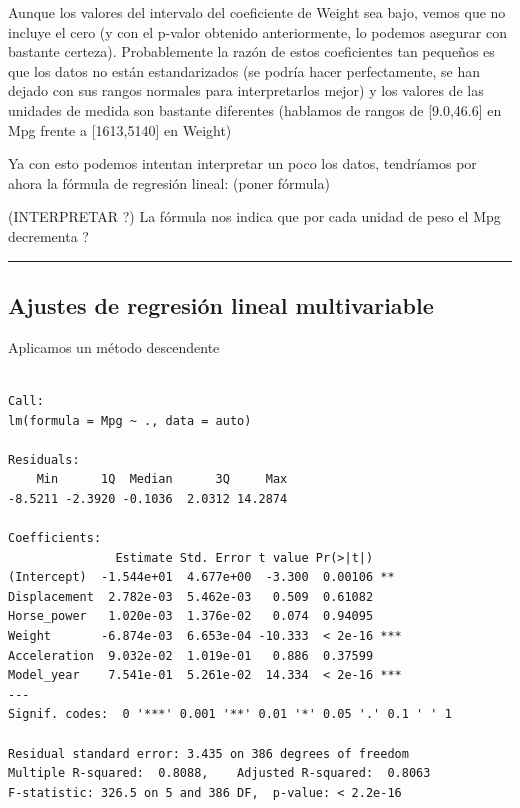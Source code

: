 \documentclass[
]{article}
\newenvironment{Shaded}{\begin{snugshade}}{\end{snugshade}}
\newcommand{\DataTypeTok}[1]{\textcolor[rgb]{0.13,0.29,0.53}{#1}}
\newcommand{\KeywordTok}[1]{\textcolor[rgb]{0.13,0.29,0.53}{\textbf{#1}}}
\newcommand{\NormalTok}[1]{#1}
\newcommand{\OperatorTok}[1]{\textcolor[rgb]{0.81,0.36,0.00}{\textbf{#1}}}
\newcommand{\StringTok}[1]{\textcolor[rgb]{0.31,0.60,0.02}{#1}}
\begin{document}
Aunque los valores del intervalo del coeficiente de Weight sea bajo,
vemos que no incluye el cero (y con el p-valor obtenido anteriormente,
lo podemos asegurar con bastante certeza). Probablemente la razón de
estos coeficientes tan pequeños es que los datos no están estandarizados
(se podría hacer perfectamente, se han dejado con sus rangos normales
para interpretarlos mejor) y los valores de las unidades de medida son
bastante diferentes (hablamos de rangos de {[}9.0,46.6{]} en Mpg frente
a {[}1613,5140{]} en Weight)

Ya con esto podemos intentan interpretar un poco los datos, tendríamos
por ahora la fórmula de regresión lineal: (poner fórmula)

(INTERPRETAR ?) La fórmula nos indica que por cada unidad de peso el Mpg
decrementa ?

\begin{center}\rule{0.5\linewidth}{0.5pt}\end{center}

\hypertarget{ajustes-de-regresiuxf3n-lineal-multivariable}{%
\subsection{Ajustes de regresión lineal
multivariable}\label{ajustes-de-regresiuxf3n-lineal-multivariable}}

Aplicamos un método descendente

\begin{Shaded}
\end{Shaded}

\begin{verbatim}

Call:
lm(formula = Mpg ~ ., data = auto)

Residuals:
    Min      1Q  Median      3Q     Max 
-8.5211 -2.3920 -0.1036  2.0312 14.2874 

Coefficients:
               Estimate Std. Error t value Pr(>|t|)    
(Intercept)  -1.544e+01  4.677e+00  -3.300  0.00106 ** 
Displacement  2.782e-03  5.462e-03   0.509  0.61082    
Horse_power   1.020e-03  1.376e-02   0.074  0.94095    
Weight       -6.874e-03  6.653e-04 -10.333  < 2e-16 ***
Acceleration  9.032e-02  1.019e-01   0.886  0.37599    
Model_year    7.541e-01  5.261e-02  14.334  < 2e-16 ***
---
Signif. codes:  0 '***' 0.001 '**' 0.01 '*' 0.05 '.' 0.1 ' ' 1

Residual standard error: 3.435 on 386 degrees of freedom
Multiple R-squared:  0.8088,    Adjusted R-squared:  0.8063 
F-statistic: 326.5 on 5 and 386 DF,  p-value: < 2.2e-16
\end{verbatim}
\end{document}

